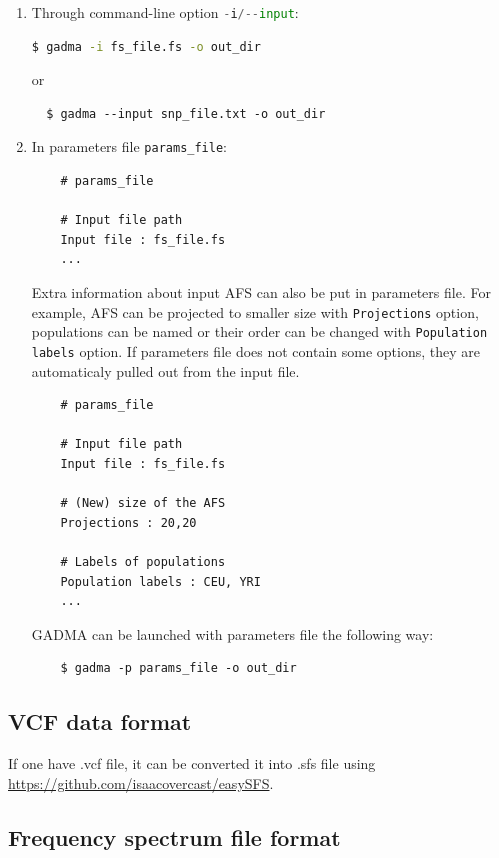\documentclass[12pt]{article}
\makeatletter
\newcommand{\py}[1]{\lstinline[language=Python, showstringspaces=False]@#1@}
\makeatother
\begin{document}
\begin{enumerate}
    \item Through command-line option \py{-i/--input}:
\begin{lstlisting}[language=bash]
  $ gadma -i fs_file.fs -o out_dir
\end{lstlisting}
  or
\begin{lstlisting}
  $ gadma --input snp_file.txt -o out_dir
\end{lstlisting}
    \item In parameters file \py{params_file}:
    
    \begin{lstlisting}
    # params_file
    
    # Input file path
    Input file : fs_file.fs 
    ...
    \end{lstlisting}
    
    Extra information about input AFS can also be put in parameters file. For example, AFS can be projected to smaller size with \py{Projections} option, populations can be named or their order can be changed with \py{Population labels} option. If parameters file does not contain some options, they are automaticaly pulled out from the input file.
    
    \begin{lstlisting}
    # params_file
    
    # Input file path
    Input file : fs_file.fs
    
    # (New) size of the AFS
    Projections : 20,20
    
    # Labels of populations
    Population labels : CEU, YRI
    ...
    \end{lstlisting}
    
GADMA can be launched with parameters file the following way:
\begin{lstlisting}
    $ gadma -p params_file -o out_dir
\end{lstlisting}

\end{enumerate}

\subsection{VCF data format}
If one have .vcf file, it can be converted it into .sfs file using \url{https://github.com/isaacovercast/easySFS}.

\subsection{Frequency spectrum file format}
\end{document}
